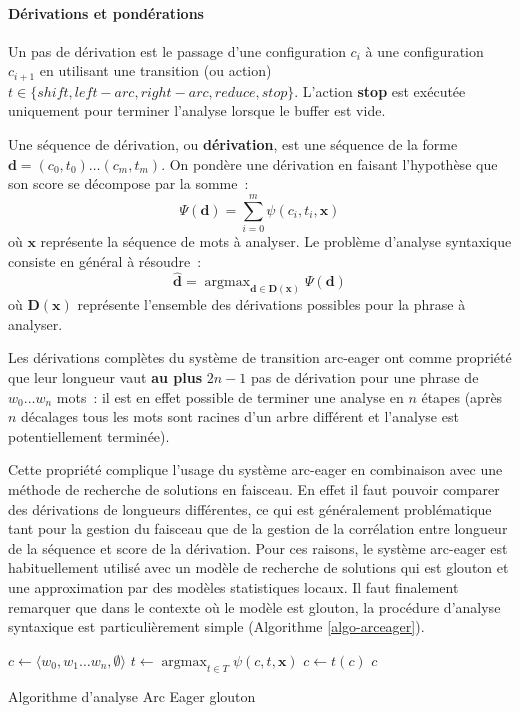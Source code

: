 \documentclass[11pt,openany]{book}
\begin{document}
\paragraph{Dérivations et pondérations} 
Un pas de dérivation est le passage d'une configuration $c_i$ à une
configuration $c_{i+1}$ en utilisant une transition (ou action) $t\in
\{shift, left-arc,right-arc, reduce,stop\}$. L'action {\bf stop} est exécutée
uniquement pour terminer l'analyse lorsque le buffer est vide.

Une séquence de dérivation, ou {\bf dérivation}, est une séquence de la
forme $\mathbf{d} = (c_0, t_0) \ldots (c_m,t_m)$. On pondère une dérivation en
faisant l'hypothèse que son score se décompose par la somme~:
\begin{equation}
\Psi(\mathbf{d}) = \sum_{i=0}^m  \psi(c_i,t_i,\mathbf{x})
\end{equation}
où $\mathbf{x}$ représente la séquence de mots à analyser.
Le problème d'analyse syntaxique consiste en général à résoudre~:
\begin{equation}
{\mathbf{\hat{d}}} = \mathop{\text{argmax}}_{\mathbf{d} \in \mathbf{D}(\mathbf{x})} \Psi(\mathbf{d}) 
\end{equation}
où $\mathbf{D}(\mathbf{x})$ représente l'ensemble des dérivations possibles pour
la phrase à analyser.

Les dérivations complètes du système de transition arc-eager ont comme
propriété que leur longueur vaut {\bf au plus} $2n-1$ pas de dérivation pour une
phrase de $w_0\ldots w_n$ mots~: il est en effet possible de terminer
une analyse en $n$ étapes (après $n$ décalages tous les mots sont
racines d'un arbre différent et l'analyse est potentiellement terminée). 

Cette propriété complique l'usage du système arc-eager en
combinaison avec une méthode de recherche de solutions en faisceau.
En effet il faut pouvoir comparer des dérivations de longueurs
différentes, ce qui est généralement problématique tant pour la 
gestion du faisceau que de la gestion de la corrélation entre longueur
de la séquence et score de la dérivation.
Pour ces raisons, le système arc-eager est habituellement utilisé avec
un modèle de recherche de solutions qui est glouton et une
approximation par des modèles statistiques locaux.
Il faut finalement remarquer que dans le contexte où le modèle est glouton, la
procédure d'analyse syntaxique est particulièrement simple (Algorithme
\ref{algo-arceager}).
\begin{algorithm}[htbp]
\begin{algorithmic}[0]
\State $c \gets \langle w_0, w_1\ldots w_n,\emptyset\rangle$
\State $t \gets \mathop{\text{argmax}}_{t\in T} \psi(c,t,\mathbf{x})$
\State $c \gets t(c)$
\EndWhile
\State \Return $c$
\EndFunction
\end{algorithmic}
\caption{\label{algo-arceager}Algorithme d'analyse Arc Eager glouton}
\end{algorithm}
\end{document}

